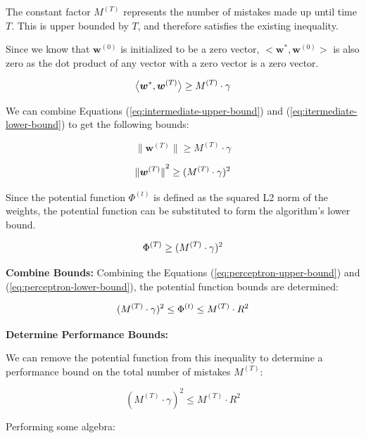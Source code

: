 \documentclass[11pt]{article}
\begin{document}
The constant factor $M^{(T)} $ represents the number of mistakes made up until time $T$. This is upper bounded by $T$, and therefore satisfies the existing inequality.

Since we know that $\boldsymbol{w}^{(0)}$ is initialized to be a zero vector, $\big< \boldsymbol{w}^*, \boldsymbol{w}^{(0)} \big>$ is also zero as the dot product of any vector with a zero vector is a zero vector.

\begin{equation}
\centering
\big< \boldsymbol{w}^*, \boldsymbol{w}^{(T)} \big>
\geq
M^{(T)} \cdot \gamma
\label{eq:itermediate-lower-bound}    
\end{equation}

We can combine Equations (\ref{eq:intermediate-upper-bound}) and (\ref{eq:itermediate-lower-bound}) to get the following bounds:

$$\lVert \boldsymbol{w}^{(T)} \rVert
\geq
M^{(T)} \cdot \gamma$$

\begin{equation}
\centering
{\lVert \boldsymbol{w}^{(T)} \rVert}^2
\geq
(M^{(T)} \cdot \gamma)^2
\label{eq:itermediate-bounds}    
\end{equation}

Since the potential function $\Phi^{(t)}$ is defined as the squared L2 norm of the weights, the potential function can be substituted to form the algorithm's lower bound.  


\begin{equation}
\centering
\Phi^{(T)}
\geq
(M^{(T)} \cdot \gamma)^2
\label{eq:perceptron-lower-bound}    
\end{equation}


\textbf{Combine Bounds:
}
    Combining the Equations (\ref{eq:perceptron-upper-bound}) and (\ref{eq:perceptron-lower-bound}), the potential function bounds are determined:


\begin{equation}
\centering
(M^{(T)} \cdot \gamma)^2
\leq
\Phi^{(t)}
\leq
M^{(T)} \cdot R^2
\label{eq:perceptron-lower-bound}    
\end{equation}

\textbf{Determine Performance Bounds:
}

We can remove the potential function from this inequality to determine a performance bound on the total number of mistakes $M^{(T)}$:

$$(M^{(T)} \cdot \gamma)^2
\leq
M^{(T)} \cdot R^2
$$

Performing some algebra:
\end{document}
